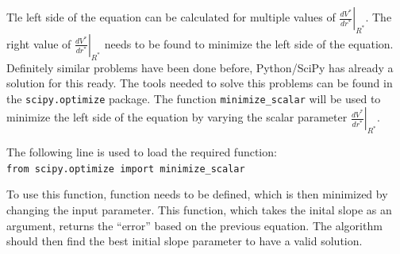 \documentclass[11pt]{article}
\begin{document}
Tle left side of the equation can be calculated for multiple values of
\(\left.\frac{dV^*}{dr^{*}}\right|_{R^*}\). The right value of
\(\left.\frac{dV^*}{dr^{*}}\right|_{R^*}\) needs to be found to minimize
the left side of the equation. Definitely similar problems have been
done before, Python/SciPy has already a solution for this ready. The
tools needed to solve this problems can be found in the
\texttt{scipy.optimize} package. The function \texttt{minimize\_scalar}
will be used to minimize the left side of the equation by varying the
scalar parameter \(\left.\frac{dV^*}{dr^{*}}\right|_{R^*}\).

The following line is used to load the required function:
\texttt{from\ scipy.optimize\ import\ minimize\_scalar}

To use this function, function needs to be defined, which is then
minimized by changing the input parameter. This function, which takes
the inital slope as an argument, returns the ``error'' based on the
previous equation. The algorithm should then find the best initial slope
parameter to have a valid solution.
\end{document}

